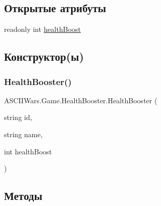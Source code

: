 \subsection*{Открытые атрибуты}
\begin{DoxyCompactItemize}
\item 
readonly int \hyperlink{class_a_s_c_i_i_wars_1_1_game_1_1_health_booster_abd6f83cc8e561198c5939ba4a20fd826}{health\+Boost}
\end{DoxyCompactItemize}


\subsection{Конструктор(ы)}
\hypertarget{class_a_s_c_i_i_wars_1_1_game_1_1_health_booster_ac7796979395fc12db8b4a8d9a9ba7d7e}{}\label{class_a_s_c_i_i_wars_1_1_game_1_1_health_booster_ac7796979395fc12db8b4a8d9a9ba7d7e} 
\subsubsection{\texorpdfstring{Health\+Booster()}{HealthBooster()}}
{\footnotesize\ttfamily A\+S\+C\+I\+I\+Wars.\+Game.\+Health\+Booster.\+Health\+Booster (\begin{DoxyParamCaption}\item[{string}]{id,  }\item[{string}]{name,  }\item[{int}]{health\+Boost }\end{DoxyParamCaption})\hspace{0.3cm}{\ttfamily [inline]}}



\subsection{Методы}
\hypertarget{class_a_s_c_i_i_wars_1_1_game_1_1_health_booster_a5396e7ebb46c32e36fefeb86ab4727d3}{}\label{class_a_s_c_i_i_wars_1_1_game_1_1_health_booster_a5396e7ebb46c32e36fefeb86ab4727d3} 
